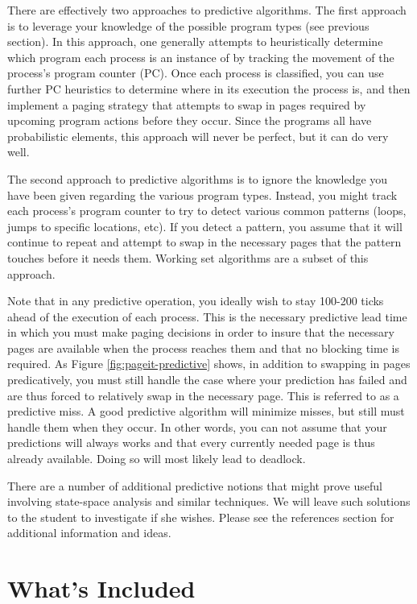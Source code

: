 \documentclass[12pt]{article}
\begin{document}
There are effectively two approaches to predictive algorithms. The
first approach is to leverage your knowledge of the possible program
types (see previous section). In this approach, one generally attempts
to heuristically determine which program each process is an instance of
by tracking the movement of the process's program counter (PC). Once each
process is classified, you can use further PC heuristics to determine where
in its execution the process is, and then implement a paging strategy
that attempts to swap in pages required by upcoming program actions
before they occur. Since the programs all have probabilistic elements,
this approach will never be perfect, but it can do very well.

The second approach to predictive algorithms is to ignore the
knowledge you have been given regarding the various program
types. Instead, you might track each process's program counter to try
to detect various common patterns (loops, jumps to specific locations,
etc). If you detect a pattern, you assume that it will continue to
repeat and attempt to swap in the necessary pages that the pattern
touches before it needs them. Working set algorithms are a subset of
this approach.

Note that in any predictive operation, you ideally wish to stay
100-200 ticks ahead of the execution of each process. This is the
necessary predictive lead time in which you must make paging decisions
in order to insure that the necessary pages are available when the
process reaches them and that no blocking time is required. As Figure
\ref{fig:pageit-predictive} shows, in addition to swapping in pages
predicatively, you must still handle the case where your prediction has
failed and are thus forced to relatively swap in the necessary
page. This is referred to as a predictive miss. A good predictive
algorithm will minimize misses, but still must handle them when they
occur. In other words, you can not assume that your predictions will
always works and that every currently needed page is thus already
available. Doing so will most likely lead to deadlock.

There are a number of additional predictive notions that might prove
useful involving state-space analysis and similar techniques. We
will leave such solutions to the student to investigate if she
wishes. Please see the references section for additional information
and ideas.

\section{What's Included}
\end{document}
